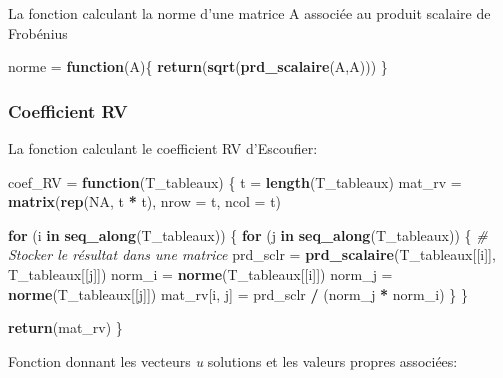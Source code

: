 \documentclass[
]{article}
\newenvironment{Shaded}{\begin{snugshade}}{\end{snugshade}}
\newcommand{\AttributeTok}[1]{\textcolor[rgb]{0.13,0.29,0.53}{#1}}
\newcommand{\CommentTok}[1]{\textcolor[rgb]{0.56,0.35,0.01}{\textit{#1}}}
\newcommand{\ConstantTok}[1]{\textcolor[rgb]{0.56,0.35,0.01}{#1}}
\newcommand{\ControlFlowTok}[1]{\textcolor[rgb]{0.13,0.29,0.53}{\textbf{#1}}}
\newcommand{\FunctionTok}[1]{\textcolor[rgb]{0.13,0.29,0.53}{\textbf{#1}}}
\newcommand{\NormalTok}[1]{#1}
\newcommand{\OtherTok}[1]{\textcolor[rgb]{0.56,0.35,0.01}{#1}}
\newcommand{\SpecialCharTok}[1]{\textcolor[rgb]{0.81,0.36,0.00}{\textbf{#1}}}
\begin{document}
La fonction calculant la norme d'une matrice A associée au produit
scalaire de Frobénius

\begin{Shaded}
\begin{Highlighting}[]
\NormalTok{norme }\OtherTok{=} \ControlFlowTok{function}\NormalTok{(A)\{}
  \FunctionTok{return}\NormalTok{(}\FunctionTok{sqrt}\NormalTok{(}\FunctionTok{prd\_scalaire}\NormalTok{(A,A)))}
\NormalTok{\}}
\end{Highlighting}
\end{Shaded}

\hypertarget{coefficient-rv-1}{%
\subsubsection{Coefficient RV}\label{coefficient-rv-1}}

La fonction calculant le coefficient RV d'Escoufier:

\begin{Shaded}
\begin{Highlighting}[]
\NormalTok{coef\_RV }\OtherTok{=} \ControlFlowTok{function}\NormalTok{(T\_tableaux) \{}
\NormalTok{  t }\OtherTok{=} \FunctionTok{length}\NormalTok{(T\_tableaux)}
\NormalTok{  mat\_rv }\OtherTok{=} \FunctionTok{matrix}\NormalTok{(}\FunctionTok{rep}\NormalTok{(}\ConstantTok{NA}\NormalTok{, t }\SpecialCharTok{*}\NormalTok{ t), }\AttributeTok{nrow =}\NormalTok{ t, }\AttributeTok{ncol =}\NormalTok{ t)}
  
  \ControlFlowTok{for}\NormalTok{ (i }\ControlFlowTok{in} \FunctionTok{seq\_along}\NormalTok{(T\_tableaux)) \{}
    \ControlFlowTok{for}\NormalTok{ (j }\ControlFlowTok{in} \FunctionTok{seq\_along}\NormalTok{(T\_tableaux)) \{}
      \CommentTok{\# Stocker le résultat dans une matrice}
\NormalTok{      prd\_sclr }\OtherTok{=} \FunctionTok{prd\_scalaire}\NormalTok{(T\_tableaux[[i]], T\_tableaux[[j]])}
\NormalTok{      norm\_i }\OtherTok{=} \FunctionTok{norme}\NormalTok{(T\_tableaux[[i]])}
\NormalTok{      norm\_j }\OtherTok{=} \FunctionTok{norme}\NormalTok{(T\_tableaux[[j]])}
\NormalTok{      mat\_rv[i, j] }\OtherTok{=}\NormalTok{ prd\_sclr }\SpecialCharTok{/}\NormalTok{ (norm\_j }\SpecialCharTok{*}\NormalTok{ norm\_i)}
\NormalTok{    \}}
\NormalTok{  \}}
  
  \FunctionTok{return}\NormalTok{(mat\_rv)}
\NormalTok{\}}
\end{Highlighting}
\end{Shaded}

Fonction donnant les vecteurs \emph{u} solutions et les valeurs propres
associées:
\end{document}
